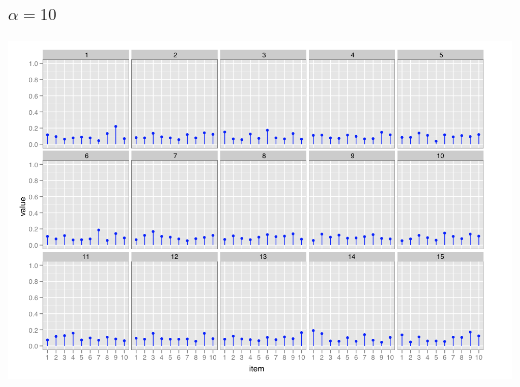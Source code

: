 \documentclass[11pt,compress,professionalfonts]{beamer}
\begin{document}
\begin{frame}[t]\frametitle{$\alpha=10$}

\centerline{\includegraphics[scale=1]{pictures/dirichlet-alpha10}}

\end{frame}
\end{document}

